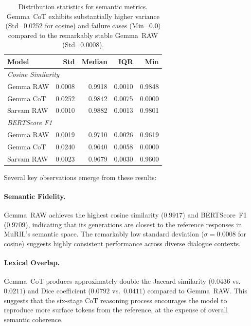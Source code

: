 \documentclass[11pt]{article}
\begin{document}
\begin{table}[t]
\centering
\small
\begin{tabular}{@{}l rrrr@{}}
\toprule
\textbf{Model} & \textbf{Std} & \textbf{Median} & \textbf{IQR} & \textbf{Min} \\
\midrule
\multicolumn{5}{l}{\textit{Cosine Similarity}} \\
Gemma RAW  & 0.0008 & 0.9918 & 0.0010 & 0.9848 \\
Gemma CoT  & 0.0252 & 0.9842 & 0.0075 & 0.0000 \\
Sarvam RAW & 0.0010 & 0.9882 & 0.0013 & 0.9801 \\
\midrule
\multicolumn{5}{l}{\textit{BERTScore F1}} \\
Gemma RAW  & 0.0019 & 0.9710 & 0.0026 & 0.9619 \\
Gemma CoT  & 0.0240 & 0.9640 & 0.0058 & 0.0000 \\
Sarvam RAW & 0.0023 & 0.9679 & 0.0030 & 0.9600 \\
\bottomrule
\end{tabular}
\caption{Distribution statistics for semantic metrics. Gemma~CoT exhibits substantially higher variance (Std=0.0252 for cosine) and failure cases (Min=0.0) compared to the remarkably stable Gemma~RAW (Std=0.0008).}
\label{tab:distribution-stats}
\end{table}

Several key observations emerge from these results:

\paragraph{Semantic Fidelity.} Gemma~RAW achieves the highest cosine similarity ($0.9917$) and BERTScore~F1 ($0.9709$), indicating that its generations are closest to the reference responses in MuRIL's semantic space. The remarkably low standard deviation ($\sigma = 0.0008$ for cosine) suggests highly consistent performance across diverse dialogue contexts.

\paragraph{Lexical Overlap.} Gemma~CoT produces approximately double the Jaccard similarity ($0.0436$ vs.\ $0.0211$) and Dice coefficient ($0.0792$ vs.\ $0.0411$) compared to Gemma~RAW. This suggests that the six-stage CoT reasoning process encourages the model to reproduce more surface tokens from the reference, at the expense of overall semantic coherence.
\end{document}
